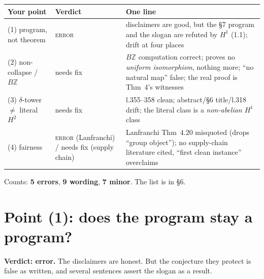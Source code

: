 \documentclass[11pt]{article}
\newcommand{\Z}{\mathbb{Z}}
\newcommand{\iss}[1]{\textsc{#1}}
\begin{document}
\begin{center}\small
\begin{tabular}{p{4.6cm}p{2.0cm}p{8.6cm}}
\toprule
Your point & Verdict & One line\\\midrule
(1) program, not theorem & \iss{error} & disclaimers are good, but the \S7 program and the slogan are refuted by $H^1$ (1.1); drift at four places\\
(2) non-collapse / $B\Z$ & needs fix & $B\Z$ computation correct; proves no \emph{uniform isomorphism}, nothing more; ``no natural map'' false; the real proof is Thm~4's witnesses\\
(3) $\delta$-tower $\neq$ literal $H^2$ & needs fix & l.355--358 clean; abstract/\S6 title/l.318 drift; the literal class is a \emph{non-abelian $H^1$} class\\
(4) fairness & \iss{error} (Lanfranchi) / needs fix (supply chain) & Lanfranchi Thm~4.20 misquoted (drops ``group object''); no supply-chain literature cited, ``first clean instance'' overclaims\\
\bottomrule
\end{tabular}
\end{center}
Counts: \textbf{5 errors}, \textbf{9 wording}, \textbf{7 minor}. The list is in \S6.

\section{Point (1): does the program stay a program?}
\textbf{Verdict: error.} The disclaimers are honest. But the conjecture they protect is false as
written, and several sentences assert the slogan as a result.
\end{document}
